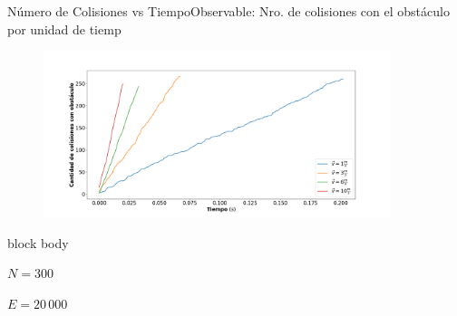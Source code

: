 \documentclass{beamer}
\begin{document}
            \begin{frame}{Número de Colisiones vs Tiempo}{Observable: Nro. de colisiones con el obstáculo por unidad de tiemp}
                \begin{figure}[H!]
                    \includegraphics[width=0.9\textwidth]{./total_collisions_vs_time}
                    \label{fig:slope_1}
                \end{figure}
                \begin{beamercolorbox}[sep=5pt,center]{block body}
                    \begin{minipage}[t]{0.45\textwidth}
                        \centering
                        \small{$N=300$}
                    \end{minipage}
                    \hfill
                    \begin{minipage}[t]{0.45\textwidth}
                        \centering
                        \small{$E=20\,000$}
                    \end{minipage}
                \end{beamercolorbox}
            \end{frame}
\end{document}
